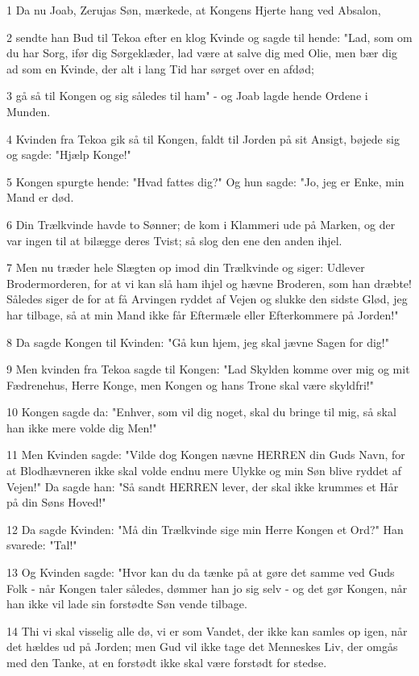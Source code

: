 \par 1 Da nu Joab, Zerujas Søn, mærkede, at Kongens Hjerte hang ved Absalon,
\par 2 sendte han Bud til Tekoa efter en klog Kvinde og sagde til hende: "Lad, som om du har Sorg, ifør dig Sørgeklæder, lad være at salve dig med Olie, men bær dig ad som en Kvinde, der alt i lang Tid har sørget over en afdød;
\par 3 gå så til Kongen og sig således til ham" - og Joab lagde hende Ordene i Munden.
\par 4 Kvinden fra Tekoa gik så til Kongen, faldt til Jorden på sit Ansigt, bøjede sig og sagde: "Hjælp Konge!"
\par 5 Kongen spurgte hende: "Hvad fattes dig?" Og hun sagde: "Jo, jeg er Enke, min Mand er død.
\par 6 Din Trælkvinde havde to Sønner; de kom i Klammeri ude på Marken, og der var ingen til at bilægge deres Tvist; så slog den ene den anden ihjel.
\par 7 Men nu træder hele Slægten op imod din Trælkvinde og siger: Udlever Brodermorderen, for at vi kan slå ham ihjel og hævne Broderen, som han dræbte! Således siger de for at få Arvingen ryddet af Vejen og slukke den sidste Glød, jeg har tilbage, så at min Mand ikke får Eftermæle eller Efterkommere på Jorden!"
\par 8 Da sagde Kongen til Kvinden: "Gå kun hjem, jeg skal jævne Sagen for dig!"
\par 9 Men kvinden fra Tekoa sagde til Kongen: "Lad Skylden komme over mig og mit Fædrenehus, Herre Konge, men Kongen og hans Trone skal være skyldfri!"
\par 10 Kongen sagde da: "Enhver, som vil dig noget, skal du bringe til mig, så skal han ikke mere volde dig Men!"
\par 11 Men Kvinden sagde: "Vilde dog Kongen nævne HERREN din Guds Navn, for at Blodhævneren ikke skal volde endnu mere Ulykke og min Søn blive ryddet af Vejen!" Da sagde han: "Så sandt HERREN lever, der skal ikke krummes et Hår på din Søns Hoved!"
\par 12 Da sagde Kvinden: "Må din Trælkvinde sige min Herre Kongen et Ord?" Han svarede: "Tal!"
\par 13 Og Kvinden sagde: "Hvor kan du da tænke på at gøre det samme ved Guds Folk - når Kongen taler således, dømmer han jo sig selv - og det gør Kongen, når han ikke vil lade sin forstødte Søn vende tilbage.
\par 14 Thi vi skal visselig alle dø, vi er som Vandet, der ikke kan samles op igen, når det hældes ud på Jorden; men Gud vil ikke tage det Menneskes Liv, der omgås med den Tanke, at en forstødt ikke skal være forstødt for stedse.
